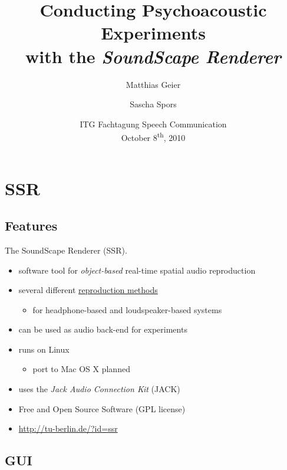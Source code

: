 \documentclass{beamer}
\title{Conducting Psychoacoustic Experiments\\
with the \emph{SoundScape Renderer}}
\author{Matthias Geier \and Sascha Spors}
\date[ITG speech 2010]{ITG Fachtagung Speech Communication\\
October 8\textsuperscript{th}, 2010}
\begin{document}
\maketitle

\section{SSR}

\subsection{Features}

\begin{frame}{The SoundScape Renderer (SSR).}
\begin{itemize}
\item software tool for \emph{object-based} real-time spatial audio reproduction
\item several different \hyperlink{reproductionmethods}{reproduction methods}
\begin{itemize}
\item for headphone-based and loudspeaker-based systems
\end{itemize}
\item can be used as audio back-end for experiments
\end{itemize}

\pause

\begin{itemize}
\item runs on Linux
\begin{itemize}
\item port to Mac OS X planned
\end{itemize}
\item uses the \emph{Jack Audio Connection Kit} (JACK)
\item Free and Open Source Software (GPL license)
\item \url{http://tu-berlin.de/?id=ssr}
\end{itemize}
\end{frame}

\subsection{GUI}
\end{document}
